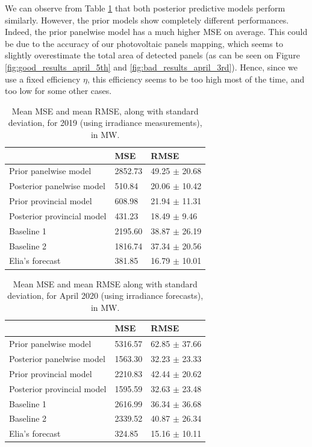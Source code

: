 \documentclass[a4paper, 12pt]{article}
\begin{document}
We can observe from Table \ref{tab:results_2019} that both posterior predictive models perform similarly. However, the prior models show completely different performances. Indeed, the prior panelwise model has a much higher MSE on average. This could be due to the accuracy of our photovoltaic panels mapping, which seems to slightly overestimate the total area of detected panels (as can be seen on Figure \ref{fig:good_results_april_5th} and \ref{fig:bad_results_april_3rd}). Hence, since we use a fixed efficiency $\eta$, this efficiency seems to be too high most of the time, and too low for some other cases.

\begin{table}[H]
\centering
\begin{tabular}{l|l|l}
                           & MSE     & RMSE
                           \\ \hline
Prior panelwise model      & 2852.73 & 49.25 $\pm$ 20.68
\\\hline
Posterior panelwise model  & 510.84  & 20.06 $\pm$ 10.42 \\ \hline
Prior provincial model     & 608.98  & 21.94 $\pm$ 11.31 \\ \hline
Posterior provincial model & 431.23  & 18.49 $\pm$ 9.46  \\ \hline
Baseline 1                 & 2195.60 & 38.87 $\pm$ 26.19 \\ \hline
Baseline 2                 & 1816.74 & 37.34 $\pm$ 20.56 \\ \hline
Elia's forecast            & 381.85  & 16.79 $\pm$ 10.01
\end{tabular}
\caption{Mean MSE and mean RMSE, along with standard deviation, for 2019 (using irradiance measurements), in \si{\mega\watt}.}
\label{tab:results_2019}
\end{table}


\begin{table}[]
\centering
\begin{tabular}{l|l|l}
                           & MSE     & RMSE              \\ \hline
Prior panelwise model      & 5316.57 & 62.85 $\pm$ 37.66 \\ \hline
Posterior panelwise model  & 1563.30 & 32.23 $\pm$ 23.33 \\ \hline
Prior provincial model     & 2210.83 & 42.44 $\pm$ 20.62 \\ \hline
Posterior provincial model & 1595.59 & 32.63 $\pm$ 23.48 \\ \hline
Baseline 1                 & 2616.99 & 36.34 $\pm$ 36.68 \\ \hline
Baseline 2                 & 2339.52 & 40.87 $\pm$ 26.34 \\ \hline
Elia's forecast            & 324.85  & 15.16 $\pm$ 10.11
\end{tabular}
\caption{Mean MSE and mean RMSE along with standard deviation, for April 2020 (using irradiance forecasts), in \si{\mega\watt}.}
\label{tab:results_april}
\end{table}
\end{document}
